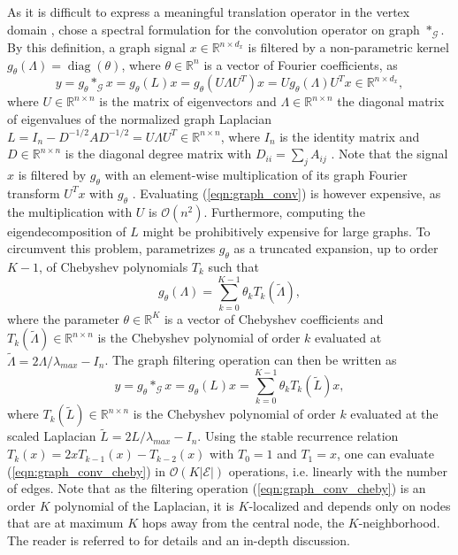 \documentclass{article}
\DeclareMathOperator*{\diag}{diag}
\newcommand{\R}{\mathbb{R}}
\newcommand{\bO}{\mathcal{O}}
\newcommand{\G}{\mathcal{G}}
\newcommand{\E}{\mathcal{E}}
\newcommand{\eqnref}[1]{(\ref{eqn:#1})}
\begin{document}
As it is difficult to express a meaningful translation operator in the vertex
domain \citep{gcnn_bruna, gcnn_niepert}, \citet{gcnn} chose a spectral
formulation for the convolution operator on graph $\ast_\G$. By this
definition, a graph signal $x \in \R^{n \times d_x}$ is filtered by a non-parametric kernel
$g_\theta(\Lambda) = \diag(\theta)$, where $\theta \in \R^n$ is a vector of
Fourier coefficients, as
\begin{equation} \label{eqn:graph_conv}
	y = g_\theta \ast_\G x = g_\theta(L) x =
	g_\theta(U \Lambda U^T) x = U g_\theta(\Lambda) U^T x \in \R^{n \times d_x},
\end{equation}
where $U \in \R^{n \times n}$ is the matrix of eigenvectors and $\Lambda \in
\R^{n \times n}$ the diagonal matrix of eigenvalues of the normalized graph
Laplacian $L = I_n - D^{-1/2} A D^{-1/2} = U \Lambda U^T \in \R^{n \times n}$,
where $I_n$ is the identity matrix and $D \in \R^{n \times n}$ is the diagonal
degree matrix with $D_{ii} = \sum_j A_{ij}$ \citep{chung}.  Note that the
signal $x$ is filtered by $g_\theta$ with an element-wise multiplication of its
graph Fourier transform $U^T x$ with $g_\theta$ \citep{gsp}. Evaluating
\eqnref{graph_conv} is however expensive, as the multiplication with $U$ is
$\bO(n^2)$. Furthermore, computing the eigendecomposition of $L$ might be
prohibitively expensive for large graphs. To circumvent this problem,
\cite{gcnn} parametrizes $g_\theta$ as a truncated expansion, up to order
$K-1$, of Chebyshev polynomials $T_k$ such that
\begin{equation} \label{eqn:filt_cheby}
	g_\theta(\Lambda) = \sum_{k=0}^{K-1} \theta_k T_k(\tilde{\Lambda}),
\end{equation}
where the parameter $\theta \in \R^K$ is a vector of Chebyshev coefficients and
$T_k(\tilde{\Lambda}) \in \R^{n \times n}$ is the Chebyshev polynomial of order
$k$ evaluated at $\tilde{\Lambda} = 2 \Lambda / \lambda_{max} - I_n$. The
graph filtering operation can then be written as
\begin{equation} \label{eqn:graph_conv_cheby}
	y = g_\theta \ast_\G x = g_\theta(L) x = \sum_{k=0}^{K-1} \theta_k T_k(\tilde{L}) x,
\end{equation}
where $T_k(\tilde{L}) \in \R^{n \times n}$ is the Chebyshev polynomial of order
$k$ evaluated at the scaled Laplacian $\tilde{L} = 2 L / \lambda_{max} - I_n$.
Using the stable recurrence relation $T_k(x) = 2x T_{k-1}(x) - T_{k-2}(x)$ with
$T_0 = 1$ and $T_1 = x$, one can evaluate \eqnref{graph_conv_cheby} in
$\bO(K|\E|)$ operations, i.e. linearly with the number of edges. Note that as
the filtering operation \eqnref{graph_conv_cheby} is an order $K$ polynomial of
the Laplacian, it is $K$-localized and depends only on nodes that are at
maximum $K$ hops away from the central node, the $K$-neighborhood. The reader
is referred to \cite{gcnn} for details and an in-depth discussion.
\end{document}

